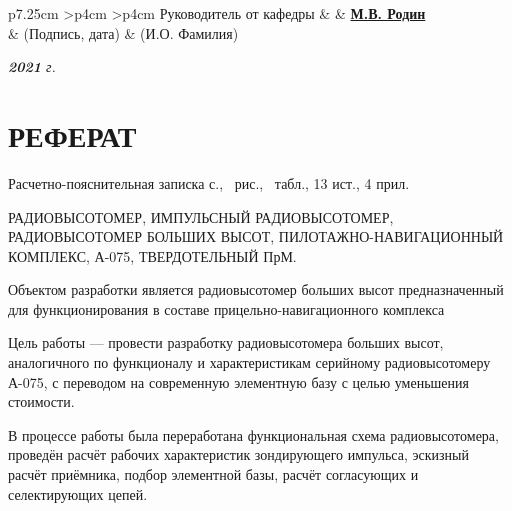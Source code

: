 \documentclass[utf8x, 14pt, oneside, a4paper]{article}
\newenvironment{signstabular}[1][1]{
	\renewcommand*{\arraystretch}{#1}
	\tabular
}{
	\endtabular
}
\begin{document}
\begin{titlepage}
\begin{table}[h!]
			\vspace{\baselineskip}
			
			\begin{signstabular}[0.7]{p{7.25cm} >{\centering\arraybackslash}p{4cm} >{\centering\arraybackslash}p{4cm}}
				Руководитель от кафедры & \uline{} & \uline{\hfill \textbf{М.В. Родин} \hfill} \\
				& \scriptsize (Подпись, дата) & \scriptsize (И.О. Фамилия)
			\end{signstabular}
			
			
		\end{table}
		
		\vfill
		
		\begin{center}
			\normalsize \textit{\textbf{2021} г.}
		\end{center}
	\end{titlepage}
	
	\normalsize
	\setcounter{page}{2}
	
	\titleformat{\section}[display]
	{\normalfont\normalsize\bfseries}{}{0pt}{\normalsize\centering}
	
	
	\section*{РЕФЕРАТ}
		\begin{center}
			Расчетно-пояснительная записка \pageref{LastPage} с., \totalfigures\ рис., \totaltables\ табл., 13 ист., 4 прил.
		\end{center}
	
		РАДИОВЫСОТОМЕР, ИМПУЛЬСНЫЙ РАДИОВЫСОТОМЕР, РАДИОВЫСОТОМЕР БОЛЬШИХ ВЫСОТ, ПИЛОТАЖНО-НАВИГАЦИОННЫЙ КОМПЛЕКС, А-075, ТВЕРДОТЕЛЬНЫЙ ПрМ.
		
		\vspace{\baselineskip}
		
		Объектом разработки является радиовысотомер больших высот предназначенный для функционирования в составе прицельно-навигационного комплекса
		
		Цель работы --- провести разработку радиовысотомера больших высот, аналогичного по функционалу и характеристикам серийному радиовысотомеру А-075, с переводом на современную элементную базу с целью уменьшения стоимости.
		
		В процессе работы была переработана функциональная схема радиовысотомера, проведён расчёт рабочих характеристик зондирующего импульса, эскизный расчёт приёмника, подбор элементной базы, расчёт согласующих и селектирующих цепей.
		
\end{document}

